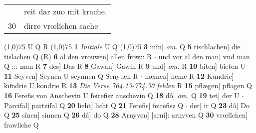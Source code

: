 \documentclass[8pt,a4paper,notitlepage]{article}
\begin{document}
\begin{table}[ht]
\begin{minipage}[t]{0.5\linewidth}
\begin{tabular}{rl}
 & reit dar zuo mit krache.\\ 
30 & dirre vrœlîchen sache\\ 
\end{tabular}
\scriptsize
\line(1,0){75} \newline
U Q R \newline
\line(1,0){75} \newline
\textbf{1} \textit{Initiale} U Q  \newline
\line(1,0){75} \newline
\textbf{3} mîn] \textit{om.} Q \textbf{5} tischlachen] die tislachen Q (R) \textbf{6} al den vrouwen] allen frow:: R  $\cdot$ und vor al den man] vnd man Q ::: man R \textbf{7} des] Das R \textbf{8} Gawan] Gawin R \textbf{9} und] \textit{om.} R \textbf{10} biten] bieten U \textbf{11} Seyven] Seynen U seynnen Q Senyuen R  $\cdot$ næmen] neme R \textbf{12} Kundrie] kuͦndrie U kondrie R \textbf{13} \textit{Die Verse 764.13-774.30 fehlen} R  \textbf{15} pflægen] pflagen Q \textbf{16} Ferefis von Anschevin U feirefisz anschevin Q \textbf{18} dô] \textit{om.} Q \textbf{19} tet] der U  $\cdot$ Parcifal] partzifal Q \textbf{20} lieht] licht Q \textbf{21} Ferefis] feirefisz Q  $\cdot$ der] ir Q \textbf{23} dâ] Do Q \textbf{25} sînen] sinnen Q \textbf{26} dâ] do Q \textbf{28} Arnyven] [arni]: arnyven Q \textbf{30} vrœlîchen] frawliche Q \newline
\end{minipage}
\end{table}
\end{document}
